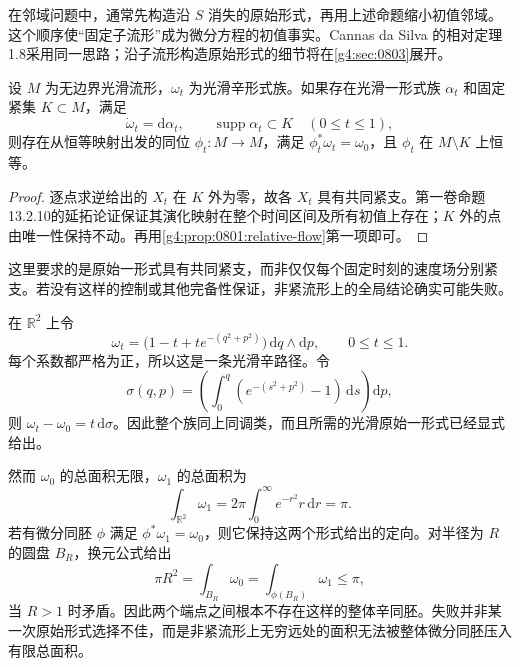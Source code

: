 \ProseParagraphBreak

在邻域问题中，通常先构造沿 \(S\) 消失的原始形式，再用上述命题缩小初值邻域。这个顺序使“固定子流形”成为微分方程的初值事实。Cannas da Silva 的相对定理1.8采用同一思路；沿子流形构造原始形式的细节将在\cref{g4:sec:0803}展开。\cite[第1.5节，第90页]{Cannas2006Symplectic}

\begin{corollary}\label{g4:cor:0801:compact-support}
	设 \(M\) 为无边界光滑流形，\(\omega_t\) 为光滑辛形式族。如果存在光滑一形式族 \(\alpha_t\) 和固定紧集 \(K\subset M\)，满足
	\[
		\dot\omega_t=\mathrm{d}\alpha_t,\qquad
		\operatorname{supp}\alpha_t\subset K\quad(0\le t\le1),
	\]
	则存在从恒等映射出发的同位 \(\phi_t:M\to M\)，满足 \(\phi_t^*\omega_t=\omega_0\)，且 \(\phi_t\) 在 \(M\setminus K\) 上恒等。
\end{corollary}
\begin{proof}
	逐点求逆给出的 \(X_t\) 在 \(K\) 外为零，故各 \(X_t\) 具有共同紧支。第一卷命题13.2.10的延拓论证保证其演化映射在整个时间区间及所有初值上存在；\(K\) 外的点由唯一性保持不动。再用\cref{g4:prop:0801:relative-flow}第一项即可。
\end{proof}

这里要求的是原始一形式具有共同紧支，而非仅仅每个固定时刻的速度场分别紧支。若没有这样的控制或其他完备性保证，非紧流形上的全局结论确实可能失败。

\begin{example}\label{g4:exm:0801:noncompact-area}
	在 \(\mathbb R^2\) 上令
	\[
		\omega_t=\bigl(1-t+t e^{-(q^2+p^2)}\bigr)\,\mathrm{d}q\wedge\mathrm{d}p,
		\qquad 0\le t\le1.
	\]
	每个系数都严格为正，所以这是一条光滑辛路径。令
	\[
		\sigma(q,p)=\left(\int_0^q(e^{-(s^2+p^2)}-1)\,\mathrm{d}s\right)\mathrm{d}p,
	\]
	则 \(\omega_t-\omega_0=t\,\mathrm{d}\sigma\)。因此整个族同上同调类，而且所需的光滑原始一形式已经显式给出。

	然而 \(\omega_0\) 的总面积无限，\(\omega_1\) 的总面积为
	\[
		\int_{\mathbb R^2}\omega_1
		=2\pi\int_0^\infty e^{-r^2}r\,\mathrm{d}r=\pi.
	\]
	若有微分同胚 \(\phi\) 满足 \(\phi^*\omega_1=\omega_0\)，则它保持这两个形式给出的定向。对半径为 \(R\) 的圆盘 \(B_R\)，换元公式给出
	\[
		\pi R^2=\int_{B_R}\omega_0
		=\int_{\phi(B_R)}\omega_1\le\pi,
	\]
	当 \(R>1\) 时矛盾。因此两个端点之间根本不存在这样的整体辛同胚。失败并非某一次原始形式选择不佳，而是非紧流形上无穷远处的面积无法被整体微分同胚压入有限总面积。
\end{example}
